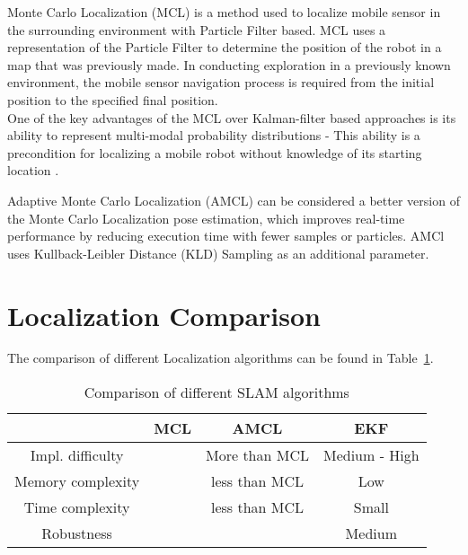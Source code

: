 \documentclass[12pt, a4paper, onecolumn]{article}
\begin{document}
Monte Carlo Localization (MCL) is a method used to localize mobile sensor in the surrounding environment with Particle Filter based. MCL uses a representation of the Particle Filter to determine the position of the robot in a map that was previously made. In conducting exploration in a previously known environment, the mobile sensor navigation process is required from the initial position to the specified final position. \\

One of the key advantages of the MCL over Kalman-filter based approaches is its ability to represent multi-modal probability distributions - This ability is a precondition for localizing a mobile robot without knowledge of its starting location \cite{MCL99}.

Adaptive Monte Carlo Localization (AMCL) can be considered a better version of the Monte Carlo Localization pose estimation, which improves real-time performance by reducing execution time with fewer samples or particles. AMCl uses Kullback-Leibler Distance (KLD) Sampling as an additional parameter. \cite{AMCL19}

\section{Localization Comparison}
The comparison of different Localization algorithms can be found in Table~\ref{tab:slam_algorithms}.
\begin{table}[h!]
  \begin{center}
    \begin{tabular}[c]{|c | c c c |}
      \hline
                       & MCL  & AMCL     & EKF                 \\
      \hline
      Impl. difficulty &       & More than MCL        & Medium - High       \\
      \hline
      Memory complexity&       & less than MCL        & Low                 \\
      \hline
      Time complexity  &        & less than MCL        & Small               \\
      \hline
      Robustness       &       &          & Medium              \\
      \hline
    \end{tabular}
  \end{center}
  \caption{Comparison of different SLAM algorithms}
  \label{tab:slam_algorithms}
\end{table}
\end{document}
